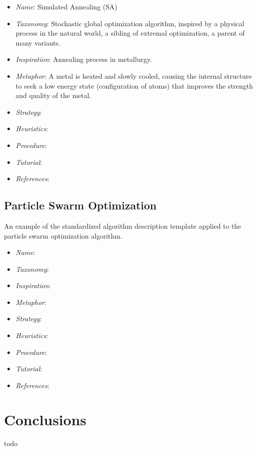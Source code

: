 \documentclass[a4paper, 11pt]{article}
\begin{document}
\begin{itemize}
	\item \emph{Name}: Simulated Annealing (SA)
	\item \emph{Taxonomy}: Stochastic global optimization algorithm, inspired by a physical process in the natural world, a sibling of extremal optimization, a parent of many variants. 
	\item \emph{Inspiration}: Annealing process in metallurgy. 
	\item \emph{Metaphor}: A metal is heated and slowly cooled, causing the internal structure to seek a low energy state (configuration of atoms) that improves the strength and quality of the metal. 
	\item \emph{Strategy}: 
	\item \emph{Heuristics}: 
	\item \emph{Procedure}: 
	\item \emph{Tutorial}: 
	\item \emph{References}: 
\end{itemize}

\subsection{Particle Swarm Optimization}
An example of the standardized algorithm description template applied to the particle swarm optimization algorithm.

\begin{itemize}
	\item \emph{Name}: 
	\item \emph{Taxonomy}: 
	\item \emph{Inspiration}: 
	\item \emph{Metaphor}: 
	\item \emph{Strategy}: 
	\item \emph{Heuristics}: 
	\item \emph{Procedure}: 
	\item \emph{Tutorial}: 
	\item \emph{References}: 
\end{itemize}

\section{Conclusions}
\label{sec:conclusions}
todo



\end{document}
